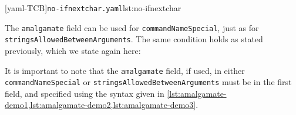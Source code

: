  \begin{cmhtcbraster}[raster column skip=.1\linewidth]
  [yaml-TCB]{\texttt{no-ifnextchar.yaml}}{lst:no-ifnextchar}
 \end{cmhtcbraster}

 The \texttt{amalgamate} field can be used for \texttt{commandNameSpecial}, just as for
 \texttt{stringsAllowedBetweenArguments}. The same condition holds as stated previously,
 which we state again here: 

 \begin{warning}
  It is important to note that the \texttt{amalgamate} field, if used, in either
  \texttt{commandNameSpecial} or \texttt{stringsAllowedBetweenArguments} must be in the
  first field, and specified using the syntax given in
  \cref{lst:amalgamate-demo1,lst:amalgamate-demo2,lst:amalgamate-demo3}.
 \end{warning}
